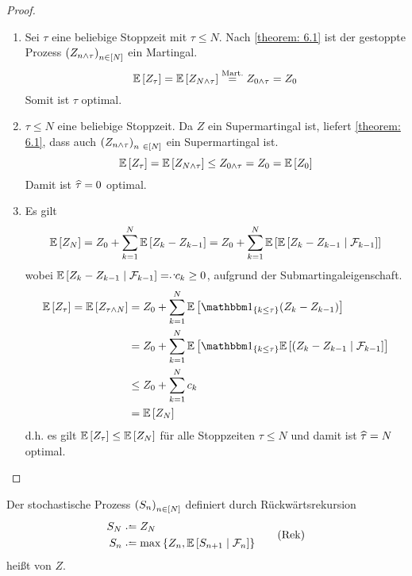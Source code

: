 \begin{proof}
	\begin{enumerate}[label=(zu \alph*), leftmargin=*]
		\item Sei $\tau$ eine beliebige Stoppzeit mit $\tau \le N$. Nach \cref{theorem: 6.1} ist der gestoppte Prozess $\left( Z_{n \land \tau} \right)_{n \in [N]}$ ein Martingal.
		\begin{equation*}
			\mathbb{E} \left[ Z_\tau \right] = \mathbb{E} \left[ Z_{N \land \tau} \right] \overset{\text{Mart.}}{=} Z_{0 \land \tau} = Z_0
		\end{equation*}
		Somit ist $\tau$ optimal.
		\item $\tau \le N$ eine beliebige Stoppzeit. Da $Z$ ein Supermartingal ist, liefert \cref{theorem: 6.1}, dass auch $\left( Z_{n \land \tau} \right)_{n \ \in [N]}$ ein Supermartingal ist.
		\begin{equation*}
			\mathbb{E} \left[ Z_\tau \right] = \mathbb{E} \left[ Z_{N \land \tau} \right] \le Z_{0 \land \tau} = Z_0 = \mathbb{E} \left[ Z_0 \right]
		\end{equation*}
		Damit ist $\widehat{\tau} = 0$ optimal.
		\item  Es gilt
		\begin{equation*}
			\mathbb{E} \left[ Z_N \right] = Z_0 + \sum_{k=1}^N \mathbb{E} \left[ Z_k - Z_{k-1} \right] 
			= Z_0 + \sum_{k=1}^N \mathbb{E} \left[ {\mathbb{E} \left[ Z_k - Z_{k-1} \mid \mathcal{F}_{k-1} \right]} \right]
		\end{equation*}
		wobei $\EW[Z_k - Z_{k-1} \mid \F_{k-1}] \defqe c_k \ge 0$, aufgrund der Submartingaleigenschaft. 
		\begin{equation*}
			\begin{aligned}
				\EW[Z_\tau] 
				= \EW[Z_{\tau \land N}] 
				&= Z_0 + \sum_{k=1}^N \EW[\one_{\menge{k \le \tau}}(Z_k - Z_{k-1})] \\
				&=  Z_0 + \sum_{k=1}^N \EW[\one_{\menge{k \le \tau}} {\EW[(Z_k - Z_{k-1} \mid \F_{k-1}]}] \\
				&\le Z_0 + \sum_{k=1}^N c_k \\ 
				&= \EW[Z_N]
			\end{aligned}
		\end{equation*}
		d.h. es gilt $\mathbb{E} \left[ Z_\tau \right] \le \mathbb{E} \left[ Z_N \right]$ für alle Stoppzeiten $\tau \le N$ und damit ist $\widehat{\tau} = N$ optimal.
	\end{enumerate}
\end{proof}

\begin{*definition}
	Der stochastische Prozess $\left( S_n \right)_{n \in [N]}$ definiert durch Rückwärtsrekursion
	\begin{equation*}
		\begin{aligned}
			S_N &\defeq Z_N \\
			S_n &\defeq \max\menge{Z_n , \EW[S_{n+1} \mid \F_n]}
		\end{aligned}
		\tag{Rek} \label{eq: snell-rek}
	\end{equation*}
	heißt  von $Z$.
\end{*definition}

